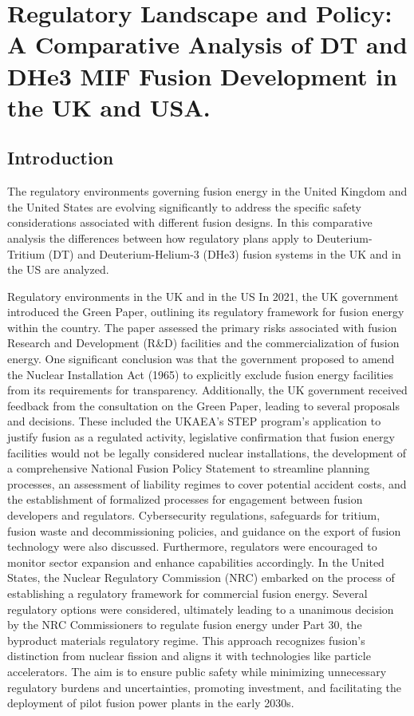 \section{Regulatory Landscape and Policy:  A Comparative Analysis of DT and DHe3 MIF Fusion Development in the UK and USA.}


\subsection{Introduction}
The regulatory environments governing fusion energy in the United Kingdom and the United States are evolving significantly to address the specific safety considerations associated with different fusion designs. In this comparative analysis the differences between how regulatory plans apply to Deuterium-Tritium (DT) and Deuterium-Helium-3 (DHe3) fusion systems in the UK and in the US are analyzed.

Regulatory environments in the UK and in the US
In 2021, the UK government introduced the Green Paper, outlining its regulatory framework for fusion energy within the country. The paper assessed the primary risks associated with fusion Research and Development (R\&D) facilities and the commercialization of fusion energy. One significant conclusion was that the government proposed to amend the Nuclear Installation Act (1965) to explicitly exclude fusion energy facilities from its requirements for transparency. \cite{Business_2022}
Additionally, the UK government received feedback from the consultation on the Green Paper, leading to several proposals and decisions. These included the UKAEA's STEP program's application to justify fusion as a regulated activity, legislative confirmation that fusion energy facilities would not be legally considered nuclear installations, the development of a comprehensive National Fusion Policy Statement to streamline planning processes, an assessment of liability regimes to cover potential accident costs, and the establishment of formalized processes for engagement between fusion developers and regulators. Cybersecurity regulations, safeguards for tritium, fusion waste and decommissioning policies, and guidance on the export of fusion technology were also discussed. Furthermore, regulators were encouraged to monitor sector expansion and enhance capabilities accordingly. \cite{Business_2022}
In the United States, the Nuclear Regulatory Commission (NRC) embarked on the process of establishing a regulatory framework for commercial fusion energy. Several regulatory options were considered, ultimately leading to a unanimous decision by the NRC Commissioners to regulate fusion energy under Part 30, the byproduct materials regulatory regime. \cite{fusionindustryassociationDecisionSeparates} This approach recognizes fusion's distinction from nuclear fission and aligns it with technologies like particle accelerators. \cite{fusionindustryassociationDecisionSeparates} The aim is to ensure public safety while minimizing unnecessary regulatory burdens and uncertainties, promoting investment, and facilitating the deployment of pilot fusion power plants in the early 2030s.

